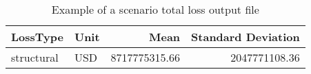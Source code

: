 \begin{table}[htbp]
\centering
\begin{tabular}{llrr}

\hline
\rowcolor{lightgray}
\bf{LossType} & \bf{Unit} & \bf{Mean} & \bf{Standard Deviation} \\
\hline
structural & USD & 8717775315.66 & 2047771108.36 \\
\hline

\end{tabular}
\caption{Example of a scenario total loss output file}
\label{output:scenario_loss_total}
\end{table}